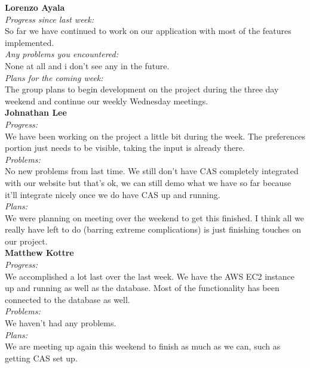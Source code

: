 \textbf{Lorenzo Ayala}\\
\noindent\textit{Progress since last week:}\\
So far we have continued to work on our application with most of the features implemented.\\

\noindent\textit{Any problems you encountered:}\\
\noindent None at all and i don't see any in the future.\\

\noindent\textit{Plans for the coming week:}\\
\noindent The group plans to begin development on the project during the three day weekend and continue our weekly Wednesday meetings.\\

\noindent\textbf{Johnathan Lee}\\
\noindent\textit{Progress:}\\
We have been working on the project a little bit during the week. The preferences portion just needs to be visible, taking the input is already there. \\ 

\noindent\textit{Problems:}\\
\noindent No new problems from last time. We still don't have CAS completely integrated with our website but that's ok, we can still demo what we have so far because it'll integrate nicely once we do have CAS up and running.\\

\noindent\textit{Plans:}\\
\noindent We were planning on meeting over the weekend to get this finished. I think all we really have left to do (barring extreme complications) is just finishing touches on our project.\\

\noindent\textbf{Matthew Kottre}\\
\noindent\textit{Progress:}\\
We accomplished a lot last over the last week. We have the AWS EC2 instance up and running as well as the database. Most of the functionality has been connected to the database as well.\\

\noindent\textit{Problems:}\\
\noindent We haven't had any problems.\\

\noindent\textit{Plans:}\\
\noindent We are meeting up again this weekend to finish as much as we can, such as getting CAS set up.\\

